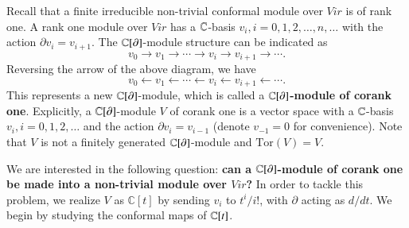 \documentclass[12pt]{amsart}
\begin{document}
Recall that a finite irreducible non-trivial conformal module over $Vir$ is of rank one.
A rank one module over $Vir$ has a $\mathbb{C}$-basis $v_i, i=0,1,2,\ldots, n, \ldots$ with the action $\partial v_i=v_{i+1}$. The $\mathbb{C}[\partial]$-module structure can be indicated as
$$v_0\rightarrow v_1\rightarrow \cdots\rightarrow v_i\rightarrow v_{i+1}\rightarrow \cdots.$$
Reversing the arrow of the above diagram, we have
$$v_0\leftarrow v_1\leftarrow \cdots\leftarrow v_i\leftarrow v_{i+1}\leftarrow \cdots.$$
This represents a new $\mathbb{C}[\partial]$-module, which is called a {\bf $\mathbb{C}[\partial]$-module of corank one}.
Explicitly, a $\mathbb{C}[\partial]$-module $V$ of corank one is a vector space with a $\mathbb{C}$-basis $v_i, i=0,1,2,\ldots$ and the action
$\partial v_i=v_{i-1}$ (denote $v_{-1}=0$ for convenience).
Note that $V$ is not a finitely generated $\mathbb{C}[\partial]$-module and $\text{Tor}(V)=V$.

We are interested in the following question: {\bf can a $\mathbb{C}[\partial]$-module of corank one be made into a non-trivial module over $Vir$?}
In order to tackle this problem, we realize $V$ as $\mathbb C[t]$ by sending $v_i$ to $t^i/i!$, with $\partial$ acting as $d/dt$.
We begin by studying the conformal maps of $\mathbb{C}[t]$.
\end{document}

